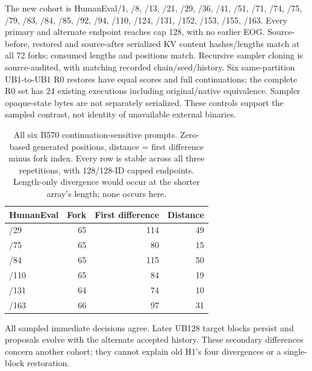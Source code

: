 The new cohort is HumanEval/1, /8, /13, /21, /29, /36, /41, /51, /71, /74, /75, /79, /83, /84, /85, /92, /94, /110, /124, /131, /152, /153, /155, /163. Every primary and alternate endpoint reaches cap 128, with no earlier EOG. Source-before, restored and source-after serialized KV content hashes/lengths match at all 72 forks; consumed lengths and positions match. Recursive sampler cloning is source-audited, with matching recorded chain/seed/history. Six same-partition UB1-to-UB1 R0 restores have equal scores and full continuations; the complete R0 set has 24 existing executions including original/native equivalence. Sampler opaque-state bytes are not separately serialized. These controls support the sampled contrast, not identity of unavailable external binaries.

\begin{table}[t]
\caption{All six B570 continuation-sensitive prompts. Zero-based generated positions, distance = first difference minus fork index. Every row is stable across all three repetitions, with 128/128-ID capped endpoints. Length-only divergence would occur at the shorter array's length; none occurs here.}
\label{tab:forkpositions}
\centering
\begin{tabular}{lrrr}
\toprule
HumanEval & Fork & First difference & Distance \\
\midrule
/29 & 65 & 114 & 49 \\
/75 & 65 & 80 & 15 \\
/84 & 65 & 115 & 50 \\
/110 & 65 & 84 & 19 \\
/131 & 64 & 74 & 10 \\
/163 & 66 & 97 & 31 \\
\bottomrule
\end{tabular}
\end{table}
All sampled immediate decisions agree. Later UB128 target blocks persist and proposals evolve with the alternate accepted history. These secondary differences concern another cohort; they cannot explain old H1's four divergences or a single-block restoration.

